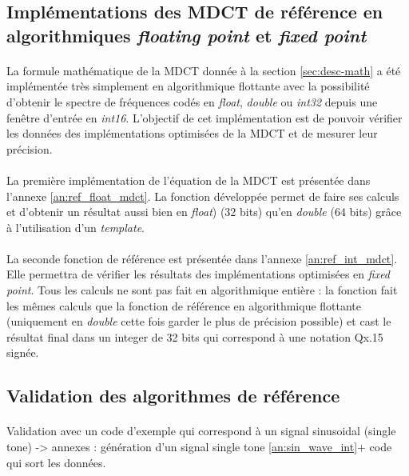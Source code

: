 \documentclass{article}
\begin{document}
    \subsection{Implémentations des MDCT de référence en algorithmiques \emph{floating point} et \emph{fixed point}}
    \paragraph{}
    La formule mathématique de la MDCT donnée à la section \ref{sec:desc-math} a été implémentée très simplement en algorithmique flottante avec la possibilité d'obtenir le spectre de fréquences codés en \emph{float}, \emph{double} ou \emph{int32} depuis une fenêtre d'entrée en \emph{int16}. L'objectif de cet implémentation est de pouvoir vérifier les données des implémentations optimisées de la MDCT et de mesurer leur précision.

    \paragraph{}
    La première implémentation de l'équation de la MDCT est présentée dans l'annexe \ref{an:ref_float_mdct}. La fonction développée permet de faire ses calculs et d'obtenir un résultat aussi bien en \emph{float}) (32 bits) qu'en \emph{double} (64 bits) grâce à l'utilisation d'un \emph{template}.

    \paragraph{}
    La seconde fonction de référence est présentée dans l'annexe \ref{an:ref_int_mdct}. Elle permettra de vérifier les résultats des implémentations optimisées en \emph{fixed point}. Tous les calculs ne sont pas fait en algorithmique entière : la fonction fait les mêmes calculs que la fonction de référence en algorithmique flottante (uniquement en \emph{double} cette fois garder le plus de précision possible) et cast le résultat final dans un integer de 32 bits qui correspond à une notation Qx.15 signée.

    \subsection{Validation des algorithmes de référence}

    \paragraph{}%
    Validation avec un code d'exemple qui correspond à un signal sinusoidal (single tone) -> annexes : génération d'un signal single tone \ref{an:sin_wave_int}+ code qui sort les données.
\end{document}
